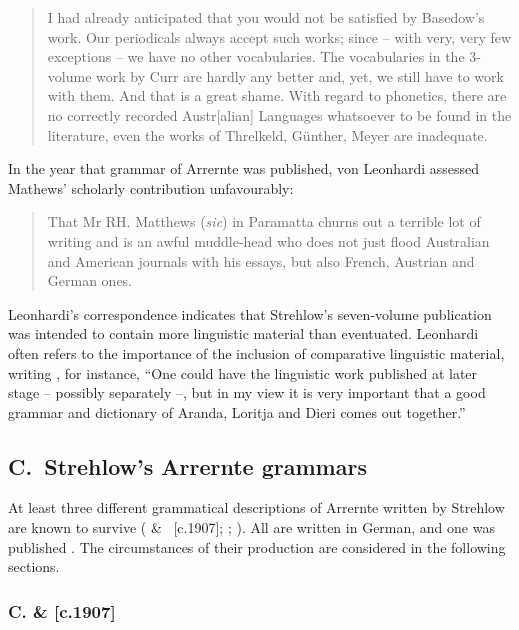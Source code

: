 \begin{quote}
I had already anticipated that you would not be satisfied by Basedow’s work. Our periodicals always accept such works; since – with very, very few exceptions – we have no other vocabularies. The vocabularies in the 3-volume work by Curr are hardly any better and, yet, we still have to work with them. And that is a great shame. With regard to phonetics, there are no correctly recorded Austr[alian] Languages whatsoever to be found in the literature, even the works of Threlkeld, Günther, Meyer are inadequate. \citep{leonhardi_letter_1908-2}
\end{quote}

In the year that  grammar of Arrernte was published, von Leonhardi assessed Mathews' scholarly contribution unfavourably:

\begin{quote}
That Mr RH. Matthews (\textit{sic}) in Paramatta churns out a terrible lot of writing and is an awful muddle-head who does not just flood Australian and American journals with his essays, but also French, Austrian and German ones. \citep{leonhardi_letter_1907}
\end{quote}

Leonhardi’s correspondence indicates that Strehlow’s seven-volume publication was intended to contain more linguistic material than eventuated. Leonhardi often refers to the importance of the inclusion of comparative linguistic material, writing \citeyearpar{leonhardi_letter_1908}, for instance, “One could have the linguistic work published at later stage – possibly separately –, but in my view it is very important that a good grammar and dictionary of Aranda, Loritja and Dieri comes out together.”

\subsection{C.~Strehlow’s Arrernte grammars}
\label{sec:key:9.2.3}

At least three different grammatical descriptions of Arrernte written by Strehlow are known to survive (\citeyear{strehlow_untitled_1931} \& \citeyear{strehlow_grammatik_1931}~[c.1907]; \citeyear{strehlow_einige_1908}; \citeyear{strehlow_notitle_1910}). All are written in German, and one was published \citeyearpar{strehlow_einige_1908}. The circumstances of their production are considered in the following sections.

\subsubsection{C. \citet{strehlow_untitled_1931} \& \citeyearpar{strehlow_grammatik_1931} [c.1907]}
\label{sec:key:9.2.3.1}\label{bkm:Ref456272021}

